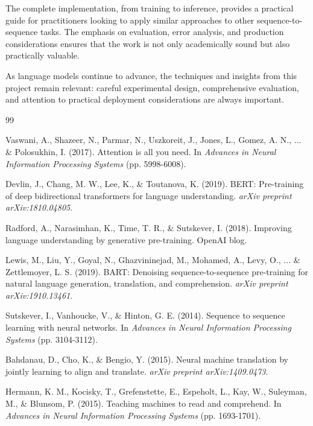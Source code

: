 \documentclass[12pt,a4paper,oneside]{report}
\begin{document}
The complete implementation, from training to inference, provides a practical guide for practitioners looking to apply similar approaches to other sequence-to-sequence tasks. The emphasis on evaluation, error analysis, and production considerations ensures that the work is not only academically sound but also practically valuable.

As language models continue to advance, the techniques and insights from this project remain relevant: careful experimental design, comprehensive evaluation, and attention to practical deployment considerations are always important.

\newpage

\begin{thebibliography}{99}

 Vaswani, A., Shazeer, N., Parmar, N., Uszkoreit, J., Jones, L., Gomez, A. N., ... \& Polosukhin, I. (2017). Attention is all you need. In \textit{Advances in Neural Information Processing Systems} (pp. 5998-6008).

 Devlin, J., Chang, M. W., Lee, K., \& Toutanova, K. (2019). BERT: Pre-training of deep bidirectional transformers for language understanding. \textit{arXiv preprint arXiv:1810.04805}.

 Radford, A., Narasimhan, K., Time, T. R., \& Sutskever, I. (2018). Improving language understanding by generative pre-training. OpenAI blog.

 Lewis, M., Liu, Y., Goyal, N., Ghazvininejad, M., Mohamed, A., Levy, O., ... \& Zettlemoyer, L. S. (2019). BART: Denoising sequence-to-sequence pre-training for natural language generation, translation, and comprehension. \textit{arXiv preprint arXiv:1910.13461}.

 Sutskever, I., Vanhoucke, V., \& Hinton, G. E. (2014). Sequence to sequence learning with neural networks. In \textit{Advances in Neural Information Processing Systems} (pp. 3104-3112).

 Bahdanau, D., Cho, K., \& Bengio, Y. (2015). Neural machine translation by jointly learning to align and translate. \textit{arXiv preprint arXiv:1409.0473}.

 Hermann, K. M., Kocisky, T., Grefenstette, E., Espeholt, L., Kay, W., Suleyman, M., \& Blunsom, P. (2015). Teaching machines to read and comprehend. In \textit{Advances in Neural Information Processing Systems} (pp. 1693-1701).

\end{thebibliography}
\end{document}
